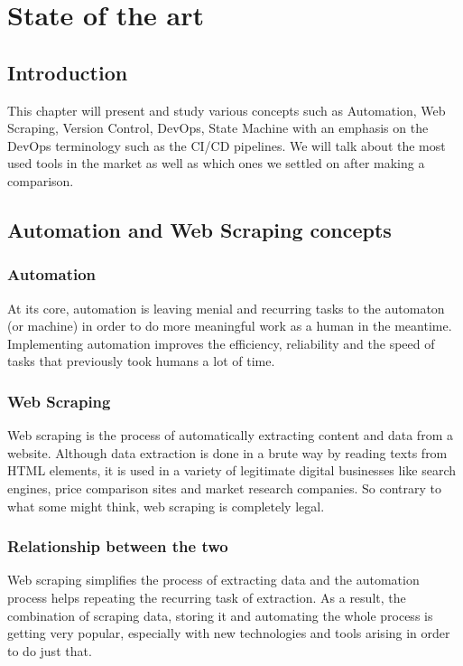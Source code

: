 \chapter{ State of the art }
\newpage

\setcounter{secnumdepth}{0} %
\section{Introduction}
This chapter will present and study various concepts such as Automation, Web Scraping, Version Control, DevOps, State Machine with an emphasis on the DevOps terminology such as the CI/CD pipelines.
We will talk about the most used tools in the market as well as which ones we settled on after making a comparison.

\setcounter{secnumdepth}{2} %
\section{Automation and Web Scraping concepts}
\subsection{Automation}
At its core, automation is leaving menial and recurring tasks to the automaton (or machine) in order to do more meaningful work as a human in the meantime.
Implementing automation improves the efficiency, reliability and the speed of tasks that previously took humans a lot of time.
\subsection{Web Scraping}
Web scraping is the process of automatically extracting content and data from a website.
Although data extraction is done in a brute way by reading texts from HTML elements, it is used in a variety of legitimate digital businesses like search engines, price comparison sites and market research companies.
So contrary to what some might think, web scraping is completely legal.
\subsection{Relationship between the two}
Web scraping simplifies the process of extracting data and the automation process helps repeating the recurring task of extraction.
As a result, the combination of scraping data, storing it and automating the whole process is getting very popular, especially with new technologies and tools arising in order to do just that.


